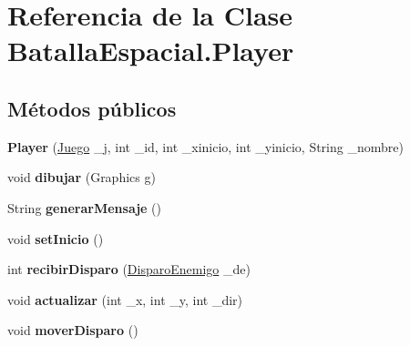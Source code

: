 \hypertarget{classBatallaEspacial_1_1Player}{
\section{Referencia de la Clase BatallaEspacial.Player}
\label{classBatallaEspacial_1_1Player}
}
\subsection*{Métodos públicos}
\begin{DoxyCompactItemize}
\item 
\hypertarget{classBatallaEspacial_1_1Player_a02b30d9d53f09e85d6ff481cde85b980}{
{\bfseries Player} (\hyperlink{classBatallaEspacial_1_1Juego}{Juego} \_\-j, int \_\-id, int \_\-xinicio, int \_\-yinicio, String \_\-nombre)}
\label{classBatallaEspacial_1_1Player_a02b30d9d53f09e85d6ff481cde85b980}

\item 
\hypertarget{classBatallaEspacial_1_1Player_ac8929d4b9f996041bfad7bc1b8eaee71}{
void {\bfseries dibujar} (Graphics g)}
\label{classBatallaEspacial_1_1Player_ac8929d4b9f996041bfad7bc1b8eaee71}

\item 
\hypertarget{classBatallaEspacial_1_1Player_aa9adf40570d1ced60965ba32398ce1bb}{
String {\bfseries generarMensaje} ()}
\label{classBatallaEspacial_1_1Player_aa9adf40570d1ced60965ba32398ce1bb}

\item 
\hypertarget{classBatallaEspacial_1_1Player_a9591bd93b0dbce55e6aa444150b46a1d}{
void {\bfseries setInicio} ()}
\label{classBatallaEspacial_1_1Player_a9591bd93b0dbce55e6aa444150b46a1d}

\item 
\hypertarget{classBatallaEspacial_1_1Player_aee74d2ba3a569e9667d5e0396f9f5478}{
int {\bfseries recibirDisparo} (\hyperlink{classBatallaEspacial_1_1DisparoEnemigo}{DisparoEnemigo} \_\-de)}
\label{classBatallaEspacial_1_1Player_aee74d2ba3a569e9667d5e0396f9f5478}

\item 
\hypertarget{classBatallaEspacial_1_1Player_a1e44cdd60bd2315c2f7c01abc08eed81}{
void {\bfseries actualizar} (int \_\-x, int \_\-y, int \_\-dir)}
\label{classBatallaEspacial_1_1Player_a1e44cdd60bd2315c2f7c01abc08eed81}

\item 
\hypertarget{classBatallaEspacial_1_1Player_ab19130e949cc7025184c788d7ee144cb}{
void {\bfseries moverDisparo} ()}
\label{classBatallaEspacial_1_1Player_ab19130e949cc7025184c788d7ee144cb}


\end{DoxyCompactItemize}
